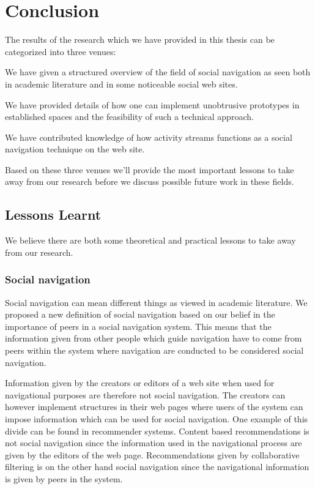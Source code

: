 \chapter{Conclusion}
\label{chapter:conclusion}

The results of the research which we have provided in this thesis can be
categorized into three venues:

\begin{enum}
  \item We have given a structured overview of the field of social navigation
    as seen both in academic literature and in some noticeable social web
    sites.
  \item We have provided details of how one can implement unobtrusive
    prototypes in established spaces and the feasibility of such a technical
    approach.
  \item We have contributed knowledge of how activity streams functions as
    a social navigation technique on the \urort{} web site.
\end{enum}

Based on these three venues we'll provide the most important lessons to take
away from our research before we discuss possible future work in these fields.

\section{Lessons Learnt}

We believe there are both some theoretical and practical lessons to take away
from our research.

\subsection{Social navigation}

Social navigation can mean different things as viewed in academic literature.
We proposed a new definition of social navigation based on our belief in the
importance of peers in a social navigation system.%
This means that the information given from other people which guide navigation
have to come from peers within the system where navigation are conducted to be
considered social navigation.

Information given by the creators or editors of a web site
when used for navigational purposes are therefore not social navigation.
The creators can however implement structures in their web pages where users
of the system can impose information which can be used for social navigation.
One example of this divide can be found in recommender systems. Content based
recommendations is not social navigation since the information used
in the navigational process are given by the editors of the web page.
Recommendations given by collaborative filtering is on the other hand social
navigation since the navigational information is given by peers in the system.

